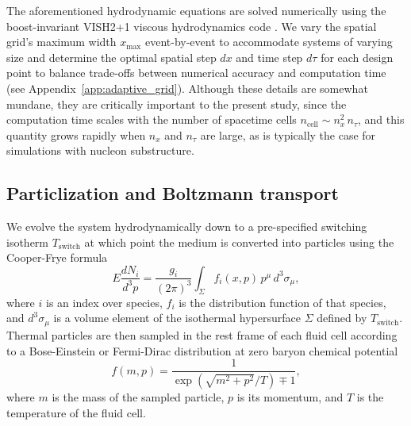 \documentclass[aps,prc,reprint,amsmath,nofootinbib]{revtex4-1}
\newcommand{\Tsw}{T_\text{switch}}
\begin{document}
The aforementioned hydrodynamic equations are solved numerically using the boost-invariant VISH2+1 viscous hydrodynamics code \cite{Song:2007ux, Shen:2014vra}.
We vary the spatial grid's maximum width $x_\mathrm{max}$ event-by-event to accommodate systems of varying size and determine the optimal spatial step $dx$ and time step $d\tau$ for each design point to balance trade-offs between numerical accuracy and computation time (see Appendix~\ref{app:adaptive_grid}).
Although these details are somewhat mundane, they are critically important to the present study, since the computation time scales with the number of spacetime cells $n_\text{cell} \sim n_x^2\, n_\tau$, and this quantity grows rapidly when $n_x$ and $n_\tau$ are large, as is typically the case for simulations with nucleon substructure.


\subsection{Particlization and Boltzmann transport}

We evolve the system hydrodynamically down to a pre-specified switching isotherm $\Tsw$ at which point the medium is converted into particles using the Cooper-Frye formula \cite{PhysRevD.10.186}
\begin{equation}
  \label{cooper-frye}
  E \frac{dN_i}{d^3p} = \frac{g_i}{(2\pi)^3} \int_\Sigma f_i(x, p)\, p^\mu\, d^3\sigma_\mu,
\end{equation}
where $i$ is an index over species, $f_i$ is the distribution function of that species, and $d^3\sigma_\mu$ is a volume element of the isothermal hypersurface $\Sigma$ defined by $\Tsw$.
Thermal particles are then sampled in the rest frame of each fluid cell according to a Bose-Einstein or Fermi-Dirac distribution at zero baryon chemical potential
\begin{equation}
  \label{distribution}
  f(m, p) = \frac{1}{\exp(\sqrt{m^2 + p^2}/T) \mp 1},
\end{equation}
where $m$ is the mass of the sampled particle, $p$ is its momentum, and $T$ is the temperature of the fluid cell.
\end{document}

